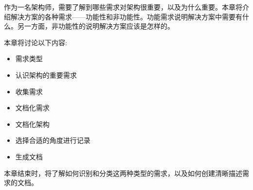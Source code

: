 作为一名架构师，需要了解到哪些需求对架构很重要，以及为什么重要。本章将介绍解决方案的各种需求——功能性和非功能性。功能需求说明解决方案中需要有什么。另一方面，非功能性的说明解决方案应该是怎样的。

本章将讨论以下内容:

\begin{itemize}
\item 需求类型
\item 认识架构的重要需求
\item 收集需求
\item 文档化需求
\item 文档化架构
\item 选择合适的角度进行记录
\item 生成文档
\end{itemize}

本章结束时，将了解如何识别和分类这两种类型的需求，以及如何创建清晰描述需求的文档。